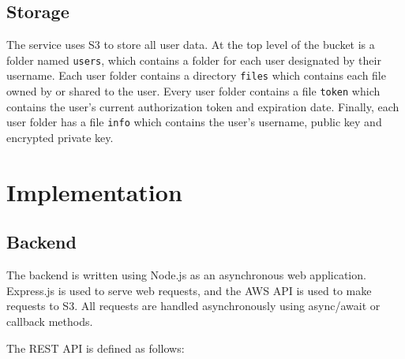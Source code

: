 \documentclass{article}
\begin{document}
\subsection{Storage}
The service uses S3 to store all user data. At the top level of the bucket is a folder named \texttt{users}, which contains a folder for each user designated by their username. Each user folder contains a directory \texttt{files} which contains each file owned by or shared to the user. Every user folder contains a file \texttt{token} which contains the user's current authorization token and expiration date. Finally, each user folder has a file \texttt{info} which contains the user's username, public key and encrypted private key.
\section{Implementation}
\subsection{Backend}
The backend is written using Node.js as an asynchronous web application. Express.js\cite{exp} is used to serve web requests, and the AWS API is used to make requests to S3. All requests are handled asynchronously using async/await or callback methods.

The REST API is defined as follows:
\end{document}
